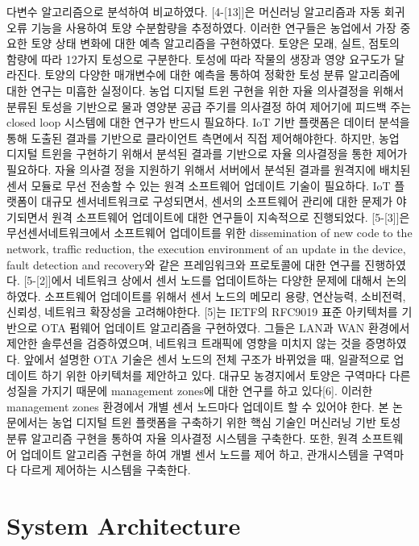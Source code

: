 \documentclass[11pt]{article}
\begin{document}
다변수 알고리즘으로 분석하여 비교하였다. [4-[13]]은 머신러닝 알고리즘과 자동 회귀 오류 기능을 사용하여 토양 수분함량을 추정하였다. 이러한 연구들은 농업에서 가장 중요한 토양 상태 변화에 대한 예측 알고리즘을 구현하였다. 토양은 모래, 실트, 점토의 함량에 따라 12가지 토성으로 구분한다. 토성에 따라 작물의 생장과 영양 요구도가 달라진다. 토양의 다양한 매개변수에 대한 예측을 통하여 정확한 토성 분류 알고리즘에 대한 연구는 미흡한 실정이다. 농업 디지털 트윈 구현을 위한 자율 의사결정을 위해서 분류된 토성을 기반으로 물과
영양분 공급 주기를 의사결정 하여 제어기에 피드백 주는 closed loop 시스템에 대한 연구가 반드시 필요하다.
IoT 기반 플랫폼은 데이터 분석을 통해 도출된 결과를 기반으로 클라이언트 측면에서 직접 제어해야한다. 하지만, 농업 디지털 트윈을 구현하기 위해서 분석된 결과를 기반으로 자율 의사결정을 통한 제어가 필요하다. 자율 의사결 정을 지원하기 위해서 서버에서 분석된 결과를 원격지에 배치된 센서 모듈로 무선 전송할 수 있는 원격 소프트웨어 업데이트 기술이 필요하다. IoT 플랫폼이 대규모 센서네트워크로 구성되면서, 센서의 소프트웨어 관리에 대한 문제가 야기되면서 원격 소프트웨어 업데이트에 대한 연구들이 지속적으로 진행되었다.
[5-[3]]은 무선센서네트워크에서 소프트웨어 업데이트를 위한 dissemination of new code to the network, traffic reduction, the execution environment of an update in the device, fault detection and recovery와 같은 프레임워크와 프로토콜에 대한 연구를 진행하였다. [5-[2]]에서 네트워크 상에서 센서 노드를
업데이트하는 다양한 문제에 대해서 논의하였다. 소프트웨어 업데이트를 위해서 센서 노드의 메모리 용량, 연산능력, 소비전력, 신뢰성, 네트워크 확장성을 고려해야한다. [5]는 IETF의 RFC9019 표준 아키텍처를 기반으로 OTA 펌웨어 업데이트 알고리즘을 구현하였다. 그들은 LAN과 WAN 환경에서 제안한 솔루션을 검증하였으며, 네트워크 트래픽에 영향을 미치지 않는 것을 증명하였다. 앞에서 설명한 OTA 기술은 센서 노드의 전체 구조가 바뀌었을 때, 일괄적으로 업데이트 하기 위한 아키텍처를 제안하고 있다. 대규모 농경지에서 토양은 구역마다 다른 성질을 가지기 때문에 management zones에 대한 연구를 하고 있다[6]. 이러한 management zones 환경에서 개별 센서 노드마다 업데이트 할 수 있어야 한다. 본 논문에서는 농업 디지털 트윈 플랫폼을 구축하기 위한 핵심 기술인 머신러닝 기반 토성 분류 알고리즘 구현을 통하여 자율 의사결정 시스템을 구축한다. 또한, 원격 소프트웨어 업데이트 알고리즘 구현을 하여 개별 센서 노드를 제어
하고, 관개시스템을 구역마다 다르게 제어하는 시스템을 구축한다.

\section{System Architecture}
\end{document}
